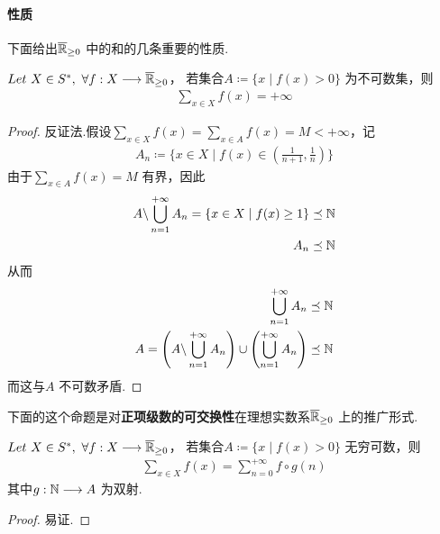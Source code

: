 \paragraph{性质}
	下面给出$\overline{\mathbb{R}}_{\geq 0}$ 中的和的几条重要的性质.
	\begin{proposition}\label{prop 1.9.1}
		$Let \,\, X \in S^* , \,\, \forall f : X \longrightarrow \overline{\mathbb{R}}_{\geq 0}$，
		若集合$A \coloneqq \{ x \mid f(x) > 0 \}$ 为不可数集，则
		\begin{align}
			\sum_{x \in X}{f(x)} = +\infty
		\end{align}
		
		\vspace*{2em}
		\begin{proof}
			反证法.假设$\underset{x \in X}{\sum}{f(x)} = \underset{x \in A}{\sum}{f(x)} = M < +\infty$，记
			\begin{align}
				A_n \coloneqq \{ x \in X \mid f(x) \in (\frac{1}{n + 1} , \frac{1}{n}) \}
			\end{align}
			由于$\underset{x \in A}{\sum}{f(x)} = M$ 有界，因此
			\begin{align}
				A \backslash \bigcup_{n = 1}^{+\infty}{A_n} = \{ x \in X \mid f(x) \geq 1 \} &\preceq \mathbb{N} \\
				A_n &\preceq \mathbb{N} 
			\end{align}
			从而
			\begin{align}
				\bigcup_{n = 1}^{+\infty}{A_n} &\preceq \mathbb{N} \\
				A = \left( A \backslash \bigcup_{n = 1}^{+\infty}{A_n} \right) \cup 
				\left( \bigcup_{n = 1}^{+\infty}{A_n} \right) &\preceq \mathbb{N}
			\end{align}
			而这与$A$ 不可数矛盾.
		\end{proof}
	\end{proposition}

	\vspace*{3em}
	下面的这个命题是对\textbf{正项级数的可交换性}在理想实数系$\overline{\mathbb{R}}_{\geq 0}$ 上的推广形式.
	\begin{proposition}\label{prop 1.9.2}
		$Let \,\, X \in S^* , \,\, \forall f : X \longrightarrow \overline{\mathbb{R}}_{\geq 0}$，
		若集合$A \coloneqq \{ x \mid f(x) > 0 \}$ 无穷可数，则
		\begin{align}
			\sum_{x \in X}{f(x)} = \sum_{n = 0}^{+\infty}{f \circ g(n)}
		\end{align}
		其中$g : \mathbb{N} \longrightarrow A$ 为双射.
		
		\vspace*{2em}
		\begin{proof}
			易证.
		\end{proof}
	\end{proposition}
	\ifx\allfiles\undefined

\fi